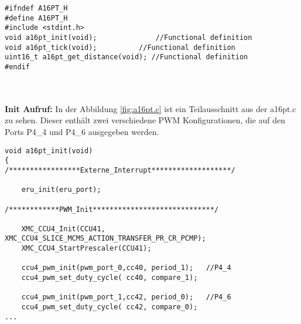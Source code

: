 \begin{minipage}{1\textwidth}
\begin{lstlisting}
#ifndef A16PT_H
#define A16PT_H
#include <stdint.h>
void a16pt_init(void);				//Functional definition
void a16pt_tick(void); 			//Functional definition
uint16_t a16pt_get_distance(void); //Functional definition
#endif
\end{lstlisting}
\label{fig:a16pt.h}
\end{minipage}\\
\\
\textbf{Init Aufruf:}
In der Abbildung \ref{fig:a16pt.c} ist ein Teilausschnitt aus der a16pt.c zu sehen. Dieser enthält zwei verschiedene PWM Konfigurationen, die auf den Ports P4\_4 und P4\_6 ausgegeben werden.

\begin{minipage}{1\textwidth}
\begin{lstlisting}
void a16pt_init(void)
{
/*****************Externe_Interrupt*******************/

	eru_init(eru_port);

/************PWM_Init*****************************/

	XMC_CCU4_Init(CCU41, XMC_CCU4_SLICE_MCMS_ACTION_TRANSFER_PR_CR_PCMP);
	XMC_CCU4_StartPrescaler(CCU41);

	ccu4_pwm_init(pwm_port_0,cc40, period_1);	//P4_4
	ccu4_pwm_set_duty_cycle( cc40, compare_1);

	ccu4_pwm_init(pwm_port_1,cc42, period_0);	//P4_6
	ccu4_pwm_set_duty_cycle( cc42, compare_0);
...
\end{lstlisting}
\label{fig:a16pt.c}
\end{minipage}



